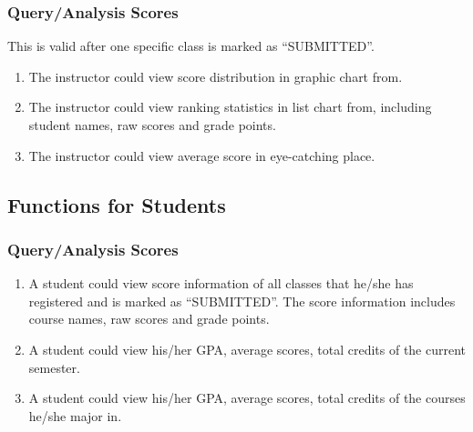 \documentclass[a4]{article}
\begin{document}
\subsubsection{Query/Analysis Scores}
This is valid after one specific class is marked as ``SUBMITTED''.
\begin{enumerate}
\item The instructor could view score distribution in graphic chart from.
\item The instructor could view ranking statistics in list chart from, including student names, raw scores and grade points.
\item The instructor could view average score in eye-catching place.
\end{enumerate}
\subsection{Functions for Students}
\subsubsection{Query/Analysis Scores}

\begin{enumerate}
\item A student could view score information of all classes that he/she has registered and is marked as ``SUBMITTED''. The score information includes course names, raw scores and grade points.
\item A student could view his/her GPA, average scores, total credits of the current semester.
\item A student could view his/her GPA, average scores, total credits of the courses he/she major in. 

\end{enumerate}
\end{document}
